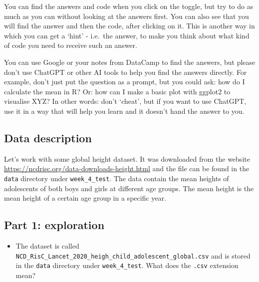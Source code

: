 \documentclass[
  letterpaper,
  DIV=11,
  numbers=noendperiod]{scrreprt}
\providecommand{\tightlist}{%
  \setlength{\itemsep}{0pt}\setlength{\parskip}{0pt}}\usepackage{longtable,booktabs,array}
\begin{document}
\begin{tcolorbox}[enhanced jigsaw, arc=.35mm, left=2mm, titlerule=0mm, rightrule=.15mm, colframe=quarto-callout-important-color-frame, coltitle=black, colback=white, opacityback=0, bottomtitle=1mm, bottomrule=.15mm, colbacktitle=quarto-callout-important-color!10!white, breakable, title=\textcolor{quarto-callout-important-color}{\faExclamation}\hspace{0.5em}{A note on AI}, toptitle=1mm, toprule=.15mm, opacitybacktitle=0.6, leftrule=.75mm]

You can find the answers and code when you click on the toggle, but try
to do as much as you can without looking at the answers first. You can
also see that you will find the answer and then the code, after clicking
on it. This is another way in which you can get a `hint' - i.e.~the
answer, to make you think about what kind of code you need to receive
such an answer.

You can use Google or your notes from DataCamp to find the answers, but
please don't use ChatGPT or other AI tools to help you find the answers
directly. For example, don't just put the question as a prompt, but you
could ask: how do I calculate the mean in R? Or: how can I make a basic
plot with ggplot2 to visualise XYZ? In other words: don't `cheat', but
if you want to use ChatGPT, use it in a way that will help you learn and
it doesn't hand the answer to you.

\end{tcolorbox}

\subsection{Data description}\label{data-description}

Let's work with some global height dataset. It was downloaded from the
website \url{https://ncdrisc.org/data-downloads-height.html} and the
file can be found in the \texttt{data} directory under
\texttt{week\_4\_test}. The data contain the mean heights of adolescents
of both boys and girls at different age groups. The mean height is the
mean height of a certain age group in a specific year.

\subsection{Part 1: exploration}\label{part-1-exploration}

\begin{itemize}
\tightlist
\item
  The dataset is called
  \texttt{NCD\_RisC\_Lancet\_2020\_heigh\_child\_adolescent\_global.csv}
  and is stored in the \texttt{data} directory under
  \texttt{week\_4\_test}. What does the \texttt{.csv} extension mean?
\end{itemize}
\end{document}
